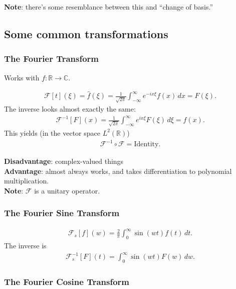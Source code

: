 \documentclass{article}
\theoremstyle{definition}
\newcommand{\R}{\mathbb{R}}
\newcommand{\F}{\mathcal{F}}
\begin{document}
\textbf{Note}: there's some resemblance between this and ``change of basis.''\\

\subsection{Some common transformations}


\subsubsection{The Fourier Transform}

Works with $f:\R \to \mathbb{C}$.


\begin{align*}
\F[t](\xi) = \hat{f}(\xi) = \frac{1}{\sqrt{2\pi}}\int^\infty_{-\infty} e^{-ix\xi}f(x)\,dx = F(\xi).
\end{align*}
The inverse looks almost exactly the same:
\begin{align*}
\F^{-1}[F](x) = \frac{1}{\sqrt{2\pi}}\int^\infty_{-\infty} e^{ix\xi}F(\xi)\,d\xi = f(x).
\end{align*}
This yields (in the vector space $L^2(\R)$)
\begin{align*}
\F^{-1}\circ \F = \text{Identity}.
\end{align*}

\textbf{Disadvantage}: complex-valued things\\

\textbf{Advantage}: almost always works, and takes differentiation to polynomial multiplication.\\

\textbf{Note}: $\F$ is a unitary operator.

\subsubsection{The Fourier Sine Transform}

\begin{align*}
\F_s[f](w) = \frac{2}{\pi}\int^\infty_{0}\sin(wt)f(t)\,dt.
\end{align*}
The inverse is
\begin{align*}
\F^{-1}_s[F](t) = \int_{0}^\infty\sin(wt)F(w)\,dw.
\end{align*}

\subsubsection{The Fourier Cosine Transform}
\end{document}
